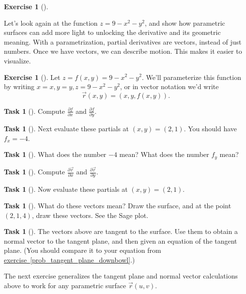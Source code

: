\documentclass[10pt,]{book}
\theoremstyle{plain}
\theoremstyle{definition}
\theoremstyle{definition}
\theoremstyle{definition}
\theoremstyle{definition}
\newtheorem{exploration}[project]{Exercise}
\newtheorem{task}[project]{Task}
\theoremstyle{definition}
\numberwithin{equation}{section}
\newcommand{\ds}{\displaystyle}
\begin{document}
\begin{exploration}[]\label{exploration-145}
\end{exploration}
Let's look again at the function \(z=9-x^2-y^2\), and show how parametric surfaces can add more light to unlocking the derivative and its geometric meaning. With a parametrization, partial derivatives are vectors, instead of just numbers. Once we have vectors, we can describe motion. This makes it easier to visualize.%
\begin{exploration}[]\label{exploration-146}
Let \(z=f(x,y)=9-x^2-y^2\). We'll parameterize this function by writing \(x=x, y=y, z=9-x^2-y^2\), or in vector notation we'd write%
\begin{equation*}
\vec r(x,y) = (x,y,f(x,y)).
\end{equation*}
%
\par
%
\begin{task}[]\label{task-323}
Compute \(\ds \frac{\partial f}{\partial x}\) and \(\ds \frac{\partial f}{\partial y}\).%
\end{task}
\begin{task}[]\label{task-324}
Next evaluate these partials at \((x,y)=(2,1)\). You should have \(f_x=-4\).%
\end{task}
\begin{task}[]\label{task-325}
What does the number \(-4\) mean? What does the number \(f_y\) mean?%
\end{task}
\begin{task}[]\label{task-326}
Compute \(\ds \frac{\partial \vec r}{\partial x}\) and \(\ds \frac{\partial \vec r}{\partial y}\).%
\end{task}
\begin{task}[]\label{task-327}
Now evaluate these partials at \((x,y)=(2,1)\).%
\end{task}
\begin{task}[]\label{task-328}
What do these vectors mean? Draw the surface, and at the point \((2,1,4)\), draw these vectors. See the Sage plot.%
%
\end{task}
\begin{task}[]\label{task-329}
The vectors above are tangent to the surface. Use them to obtain a normal vector to the tangent plane, and then given an equation of the tangent plane. (You should compare it to your equation from \hyperref[prob_tangent_plane_downbowl]{exercise~\ref{prob_tangent_plane_downbowl}}.)%
\end{task}
\end{exploration}
The next exercise generalizes the tangent plane and normal vector calculations above to work for any parametric surface \(\vec r(u,v)\).%
\end{document}
